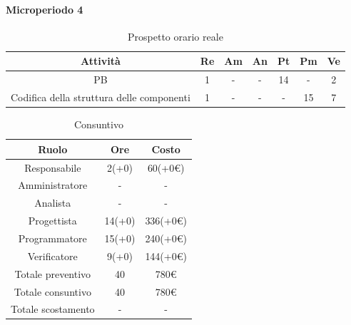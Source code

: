\paragraph{Microperiodo 4}
\begin{table}[H]
	\centering
	\begin{tabular}{|c|c|c|c|c|c|c|}
		\hline
		\rowcolor{lighter-grayer}
		
		\textbf{Attività}                         & \textbf{Re} & \textbf{Am} & \textbf{An} & \textbf{Pt} & \textbf{Pm} & \textbf{Ve} \\ \hline
		PB                                        & 1           & -           & -           & 14          & -           & 2           \\ \hline
		Codifica della struttura delle componenti & 1           & -           & -           & -           & 15          & 7           \\ \hline	
		
	\end{tabular}
	\caption{ Prospetto orario reale\\}
\end{table}

\begin{table}[H]
	\centering
	\renewcommand{\arraystretch}{1.5}
	\begin{tabular}{|c|c|c|}
		\hline
		\rowcolor{lighter-grayer}
		Ruolo & Ore & Costo \\ \hline
		Responsabile & 2(+0) & 60(+0\euro) \\ \hline
		Amministratore & - & - \\ \hline
		Analista & - & - \\ \hline
		Progettista & 14(+0) & 336(+0\euro) \\ \hline
		Programmatore & 15(+0) & 240(+0\euro) \\ \hline
		Verificatore & 9(+0) & 144(+0\euro) \\ \hline
		Totale preventivo & 40 & 780\euro \\ \hline
		Totale consuntivo & 40 & 780\euro \\ \hline
		Totale scostamento & - & - \\ \hline
	\end{tabular}
	\caption{ Consuntivo\\}
\end{table}

